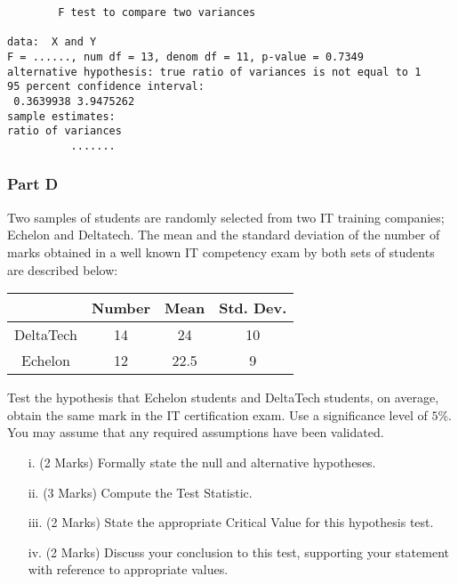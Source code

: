 \begin{framed}
\begin{verbatim}
        F test to compare two variances

data:  X and Y
F = ......, num df = 13, denom df = 11, p-value = 0.7349
alternative hypothesis: true ratio of variances is not equal to 1
95 percent confidence interval:
 0.3639938 3.9475262
sample estimates:
ratio of variances
          .......
\end{verbatim}
\end{framed}

\subsubsection*{Part D} %
Two samples of students are randomly selected from two IT training companies; Echelon and Deltatech. The mean and the standard deviation of the number of marks obtained in a well known IT competency exam by both sets of students are described below:\\

\begin{center}
\begin{tabular}{|c|c|c|c|}

  \hline
	&Number&	Mean&	Std. Dev.\\ \hline
DeltaTech	&14	&24	&10\\
Echelon	&12	&22.5	&9\\
  \hline
\end{tabular}
\end{center}


Test the hypothesis that Echelon students and DeltaTech students, on average, obtain the same mark in the IT certification exam. Use a significance level of $5\%$. You may assume that any required assumptions have been validated.
\bigskip

\begin{itemize}
\item[i.](2 Marks) Formally state the null and alternative hypotheses.
\item[ii.](3 Marks) Compute the Test Statistic.
\item[iii.](2 Marks) State the appropriate Critical Value for this hypothesis test.
\item[iv.](2 Marks) Discuss your conclusion to this test, supporting your statement with reference to appropriate values.
\end{itemize}

